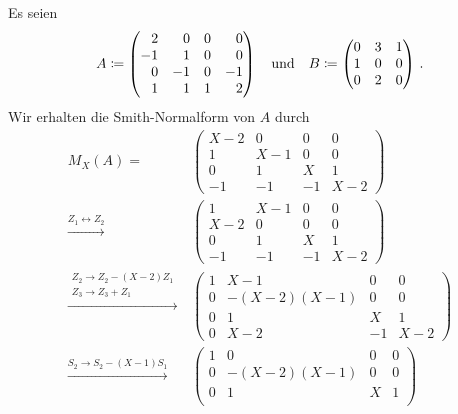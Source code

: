 Es seien
\[
            A
  \defined  \begin{pmatrix*}[r]
               2  &  0  & 0 &  0  \\
              -1  &  1  & 0 &  0  \\
               0  & -1  & 0 & -1  \\
               1  &  1  & 1 &  2
            \end{pmatrix*}
  \quad\text{und}\quad
            B
  \defined  \begin{pmatrix*}[r]
              0 & 3 & 1 \\
              1 & 0 & 0 \\
              0 & 2 & 0
            \end{pmatrix*} \,.
\]
Wir erhalten die Smith-Normalform von $A$ durch
\begingroup
\allowdisplaybreaks
\begin{align*}
    M_X(A)
  =&\,
    \begin{pmatrix}
      X-2 &   0 &   0 &   0 \\
        1 & X-1 &   0 &   0 \\
        0 &   1 & X   &   1 \\
       -1 &  -1 &  -1 & X-2
    \end{pmatrix}
  \\
  \xrightarrow{Z_1 \leftrightarrow Z_2}&\,
    \begin{pmatrix}
        1 & X-1 &   0 &   0 \\
      X-2 &   0 &   0 &   0 \\
        0 &   1 & X   &   1 \\
       -1 &  -1 &  -1 & X-2
    \end{pmatrix}
  \\
  \xrightarrow{\substack{Z_2 \to Z_2 - (X-2) Z_1 \\ Z_3 \to Z_3 + Z_1}}&\,
    \begin{pmatrix}
      1 &         X-1 &   0 &   0 \\
      0 & -(X-2)(X-1) &   0 &   0 \\
      0 &           1 & X   &   1 \\
      0 &         X-2 &  -1 & X-2
    \end{pmatrix}
  \\
  \xrightarrow{S_2 \to S_2 - (X-1) S_1}&\,
    \begin{pmatrix}
      1 &           0 &   0 &   0 \\
      0 & -(X-2)(X-1) &   0 &   0 \\
      0 &           1 & X   &   1 \\

\end{pmatrix}
\end{align*}

